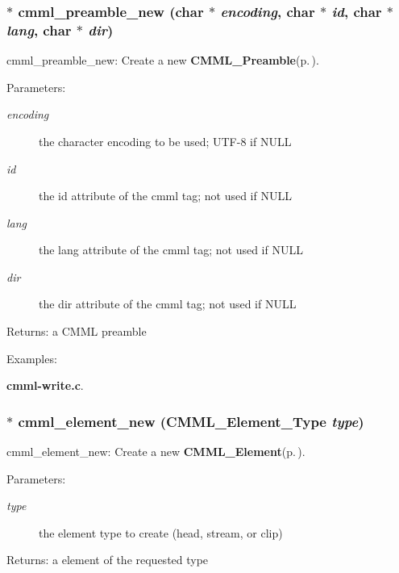 \subsubsection{$\ast$ cmml\_\-preamble\_\-new (char $\ast$ {\em encoding}, char $\ast$ {\em id}, char $\ast$ {\em lang}, char $\ast$ {\em dir})}\label{cmml_8h_a56}


cmml\_\-preamble\_\-new: Create a new {\bf CMML\_\-Preamble}{\rm (p.\,\pageref{structCMML__Preamble})}.

\begin{Desc}
\item[Parameters:]
\begin{description}
\item[{\em encoding}]the character encoding to be used; UTF-8 if NULL \item[{\em id}]the id attribute of the cmml tag; not used if NULL \item[{\em lang}]the lang attribute of the cmml tag; not used if NULL \item[{\em dir}]the dir attribute of the cmml tag; not used if NULL\end{description}
\end{Desc}
\begin{Desc}
\item[Returns:]a CMML preamble \end{Desc}
\begin{Desc}
\item[Examples: ]\par
{\bf cmml-write.c}.\end{Desc}
\subsubsection{$\ast$ cmml\_\-element\_\-new ({\bf CMML\_\-Element\_\-Type} {\em type})}\label{cmml_8h_a57}


cmml\_\-element\_\-new: Create a new {\bf CMML\_\-Element}{\rm (p.\,\pageref{structCMML__Element})}.

\begin{Desc}
\item[Parameters:]
\begin{description}
\item[{\em type}]the element type to create (head, stream, or clip)\end{description}
\end{Desc}
\begin{Desc}
\item[Returns:]a element of the requested type \end{Desc}
